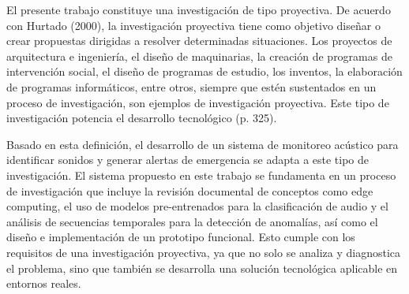 
El presente trabajo constituye una investigación de tipo proyectiva. De acuerdo con Hurtado (2000), la investigación proyectiva tiene como objetivo diseñar o crear propuestas dirigidas a resolver determinadas situaciones. Los proyectos de arquitectura e ingeniería, el diseño de maquinarias, la creación de programas de intervención social, el diseño de programas de estudio, los inventos, la elaboración de programas informáticos, entre otros, siempre que estén sustentados en un proceso de investigación, son ejemplos de investigación proyectiva. Este tipo de investigación potencia el desarrollo tecnológico (p. 325).

Basado en esta definición, el desarrollo de un sistema de monitoreo acústico para identificar sonidos y generar alertas de emergencia se adapta a este tipo de investigación. El sistema propuesto en este trabajo se fundamenta en un proceso de investigación que incluye la revisión documental de conceptos como edge computing, el uso de modelos pre-entrenados para la clasificación de audio y el análisis de secuencias temporales para la detección de anomalías, así como el diseño e implementación de un prototipo funcional. Esto cumple con los requisitos de una investigación proyectiva, ya que no solo se analiza y diagnostica el problema, sino que también se desarrolla una solución tecnológica aplicable en entornos reales.

